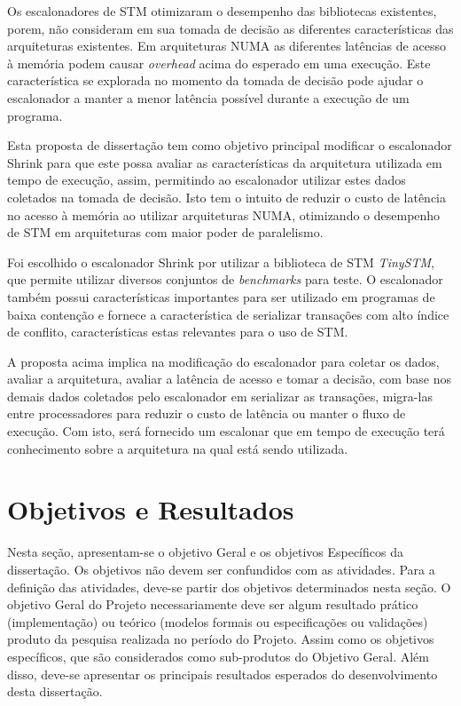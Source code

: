 \documentclass[diss-proposta,nocipinfo]{texufpel}
\begin{document}
Os escalonadores de STM otimizaram o desempenho das bibliotecas existentes, porem, não consideram em sua tomada de decisão as diferentes características das arquiteturas existentes. Em arquiteturas NUMA as diferentes latências de acesso à memória podem causar \emph{overhead} acima do esperado em uma execução. Este característica se explorada no momento da tomada de decisão pode ajudar o escalonador a manter a menor latência possível durante a execução de um programa.

Esta proposta de dissertação tem como objetivo principal modificar o escalonador Shrink para que este possa avaliar as características da arquitetura utilizada em tempo de execução, assim, permitindo ao escalonador utilizar estes dados coletados na tomada de decisão. Isto tem o intuito de reduzir o custo de latência no acesso à memória ao utilizar arquiteturas NUMA, otimizando o desempenho de STM em arquiteturas com maior poder de paralelismo.

Foi escolhido o escalonador Shrink por utilizar a biblioteca de STM \emph{TinySTM}, que permite utilizar diversos conjuntos de \emph{benchmarks} para teste. O escalonador também possui características importantes para ser utilizado em programas de baixa contenção e fornece a característica de serializar transações com alto índice de conflito, características estas relevantes para o uso de STM.

A proposta acima implica na modificação do escalonador para coletar os dados, avaliar a arquitetura, avaliar a latência de acesso e tomar a decisão, com base nos demais dados coletados pelo escalonador em serializar as transações, migra-las entre processadores para reduzir o custo de latência ou manter o fluxo de execução. Com isto, será fornecido um escalonar que em tempo de execução terá conhecimento sobre a arquitetura na qual está sendo utilizada.

\chapter{Objetivos e Resultados}

Nesta seção, apresentam-se o objetivo Geral e os objetivos Específicos
da dissertação. Os objetivos não devem ser confundidos com as
atividades. Para a definição das atividades, deve-se partir dos
objetivos determinados nesta seção. O objetivo Geral do Projeto
necessariamente deve ser algum resultado prático (implementação) ou
teórico (modelos formais ou especificações ou validações) produto da
pesquisa realizada no período do Projeto. Assim como os objetivos
específicos, que são considerados como sub-produtos do Objetivo
Geral. Além disso, deve-se apresentar os principais resultados
esperados do desenvolvimento desta dissertação.
\end{document}
